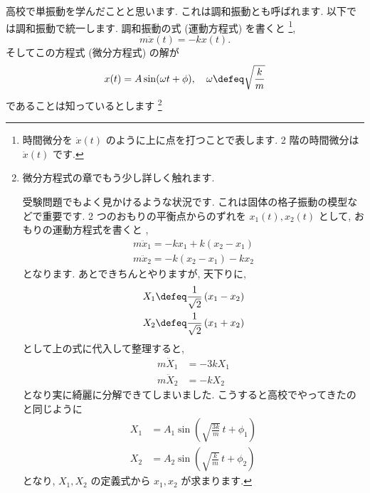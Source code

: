 \documentclass[openany, a4paper, oneside]{jsbook}
\begin{document}
高校で単振動を学んだことと思います.
これは調和振動とも呼ばれます.
以下では調和振動で統一します.
調和振動の式 (運動方程式) を書くと \footnote{時間微分を  $\dot{x}(t)$ のように上に点を打つことで表します.
2 階の時間微分は  $\ddot{x}(t)$ です.},
\begin{equation}
m\ddot{x}(t) = -kx (t).
\end{equation}
そしてこの方程式 (微分方程式) の解が
\begin{equation}
x (t) = A \sin (\omega t + \phi ), \quad \omega \defeq \sqrt{ \frac{k}{m} }
\end{equation}
であることは知っているとします \footnote{微分方程式の章でもう少し詳しく触れます.

受験問題でもよく見かけるような状況です. これは固体の格子振動の模型などで重要です.
2 つのおもりの平衡点からのずれを $x_{1}(t),x_{2}(t)$ として, おもりの運動方程式を書くと \footnotemark,
\begin{align}
m\ddot{x}_{1} = -kx_{1} + k (x_{2} - x_{1}) \\
m\ddot{x}_{2} = - k (x_{2} - x_{1}) - kx_{2}
\end{align}
となります. あとできちんとやりますが, 天下りに,
\begin{align}
X_{1} \defeq \frac{1}{\sqrt{2}}\left ( x_{1} - x_{2} \right) \\
X_{2} \defeq \frac{1}{\sqrt{2}}\left ( x_{1} + x_{2} \right)
\end{align}
として上の式に代入して整理すると,
\begin{align}
    m\ddot{X}_{1} &= - 3kX_{1} \\
    m\ddot{X}_{2} &= -kX_{2}
\end{align}
となり実に綺麗に分解できてしまいました.
こうすると高校でやってきたのと同じように
\begin{align}
    X_1 &= A_1 \sin \left ( \sqrt{\frac{ 3k }{m}} \, t + \phi _1 \right) \\
    X_2 &= A_2 \sin \left ( \sqrt{\frac{ k }{m}} \, t + \phi _2 \right)
\end{align}
となり,  $X_1, X_2$ の定義式から $x_1,x_2$ が求まります.}
\end{document}
